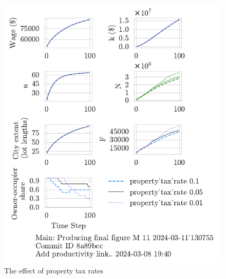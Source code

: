 \begin{figure}[h!tb]
    \centering
    \includegraphics[scale=.8, trim={0 1.4cm 0 0},clip]{fig/property_tax_rate-Main-130755.pdf}
    \caption{The effect of property tax rates}
    \label{fig:property_tax_ownership_trajectory}
\end{figure}